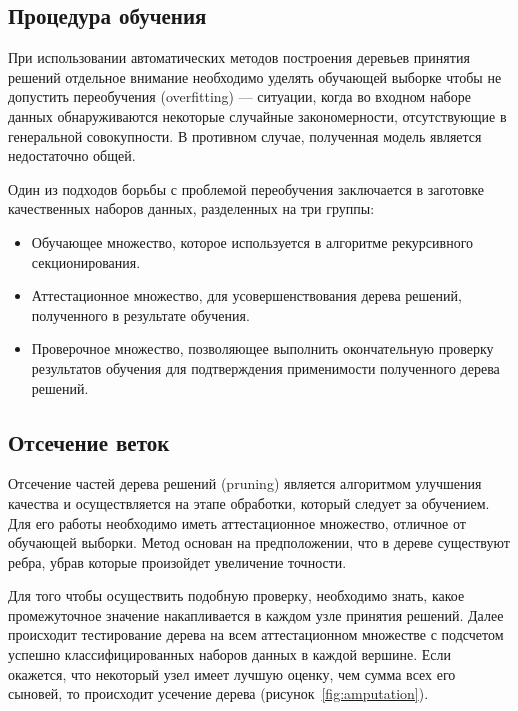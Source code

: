 \documentclass[a4paper,14pt]{extarticle} %
\begin{document}
\subsection{Процедура обучения}
\hspace{\parindent} При использовании автоматических методов построения деревьев принятия решений отдельное внимание необходимо уделять обучающей выборке чтобы не допустить переобучения (overfitting) --- ситуации, когда во входном наборе данных обнаруживаются некоторые случайные закономерности, отсутствующие в генеральной совокупности. В противном случае, полученная модель является недостаточно общей.

Один из подходов борьбы с проблемой переобучения заключается в заготовке качественных наборов данных, разделенных на три группы:
\begin{itemize}
\item Обучающее множество, которое используется в алгоритме рекурсивного секционирования.
\item Аттестационное множество, для усовершенствования дерева решений, полученного в результате обучения.
\item Проверочное множество, позволяющее выполнить окончательную проверку результатов обучения для подтверждения применимости полученного дерева решений.
\end{itemize}

\subsection{Отсечение веток}
\hspace{\parindent} Отсечение частей дерева решений (pruning) является алгоритмом улучшения качества и осуществляется на этапе обработки, который следует за обучением. Для его работы необходимо иметь аттестационное множество, отличное от обучающей выборки. Метод основан на предположении, что в дереве существуют ребра, убрав которые произойдет увеличение точности.

Для того чтобы осуществить подобную проверку, необходимо знать, какое промежуточное значение накапливается в каждом узле принятия решений. Далее происходит тестирование дерева на всем аттестационном множестве с подсчетом успешно классифицированных наборов данных в каждой вершине. Если окажется, что некоторый узел имеет лучшую оценку, чем сумма всех его сыновей, то происходит усечение дерева (рисунок~\ref{fig:amputation}).
\end{document}
